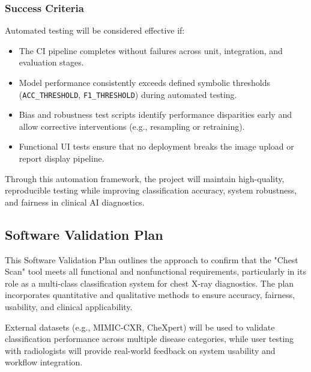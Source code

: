 \documentclass[12pt, titlepage]{article}
\begin{document}
\subsubsection{Success Criteria}
Automated testing will be considered effective if:
\begin{itemize}
  \item The CI pipeline completes without failures across unit, integration, and evaluation stages.
  \item Model performance consistently exceeds defined symbolic thresholds (\texttt{ACC\_THRESHOLD}, \texttt{F1\_THRESHOLD}) during automated testing.
  \item Bias and robustness test scripts identify performance disparities early and allow corrective interventions (e.g., resampling or retraining).
  \item Functional UI tests ensure that no deployment breaks the image upload or report display pipeline.
\end{itemize}

Through this automation framework, the project will maintain high-quality, reproducible testing while improving classification accuracy, system robustness, and fairness in clinical AI diagnostics.


\subsection{Software Validation Plan}


This Software Validation Plan outlines the approach to confirm that the "Chest Scan" tool meets all functional and nonfunctional requirements, particularly in its role as a multi-class classification system for chest X-ray diagnostics. The plan incorporates quantitative and qualitative methods to ensure accuracy, fairness, usability, and clinical applicability.

External datasets (e.g., MIMIC-CXR, CheXpert) will be used to validate classification performance across multiple disease categories, while user testing with radiologists will provide real-world feedback on system usability and workflow integration.
\end{document}
